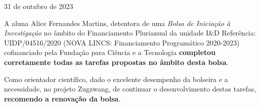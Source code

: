 \documentclass{oficio}
\begin{document}
\unidade{\textsc{\DI}}
{31 de outubro de 2023}


A aluna 
%
Alice Fernandes Martins, 
%
detentora de uma \emph{Bolsa de Iniciação à Investigação} no âmbito do Financiamento Plurianual da unidade I\&D Referência: UIDP/04516/2020 (NOVA LINCS: Financiamento Programático 2020-2023) cofinanciado pela Fundação para Ciência e a Tecnologia
%
\textbf{completou corretamente todas as tarefas propostas no âmbito desta bolsa}.
%

%
Como orientador científico, 
%
dado o excelente desempenho da bolseira e a necessidade, no projeto Zugzwang, de continuar o desenvolvimento destas tarefas, \textbf{recomendo a renovação da bolsa}.

\end{document}
